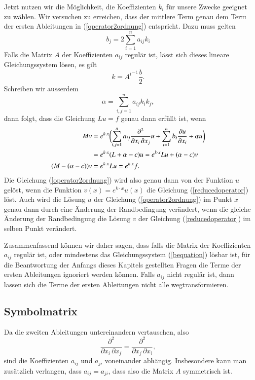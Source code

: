 Jetzt nutzen wir die Möglichkeit, die Koeffizienten $k_i$ für unsere
Zwecke geeignet zu wählen.
Wir versuchen zu erreichen, dass der mittlere Term genau dem Term 
der ersten Ableitungen in (\ref{operator2ordnung}) entspricht.
Dazu muss gelten
\begin{equation}
b_j=2\sum_{i=1}^n a_{ij}k_i
\label{bequation}
\end{equation}
Falls die Matrix $A$ der Koeffizienten $a_{ij}$ regulär ist, lässt
sich dieses lineare Gleichungssystem lösen, es gilt
\[
k=
{A^t}^{-1}
\frac{b}2.
\]
Schreiben wir ausserdem
\[
\alpha = \sum_{i,j=1}^n a_{ij}k_ik_j,
\]
dann folgt, dass die Gleichung $Lu=f$ genau dann erfüllt ist, wenn
\begin{align}
Mv
&=
e^{k\cdot x}\biggl(
\sum_{i,j=1}^n a_{ij}\frac{\partial^2}{\partial x_i\,\partial x_j}u
+\sum_{i=1}^n b_i\frac{\partial u}{\partial x_i}+\alpha u
\biggr)
\\
&=
e^{k\cdot x}
(L+\alpha -c)u
=
e^{k\cdot x}Lu + (\alpha -c)v
\notag
\\
(M-(\alpha - c))v&=e^{k\cdot x}Lu=e^{k\cdot x}f.
\label{reducedoperator}
\end{align}
Die Gleichung (\ref{operator2ordnung}) wird also genau dann von der
Funktion $u$ gelöst, wenn die Funktion $v(x)=e^{k\cdot x}u(x)$ 
die Gleichung (\ref{reducedoperator}) löst.
Auch wird die Lösung $u$ der Gleichung (\ref{operator2ordnung})
im Punkt $x$ 
genau dann durch eine Änderung der Randbedingung verändert, 
wenn die gleiche Änderung der Randbedingung die Lösung $v$ 
der Gleichung (\ref{reducedoperator}) im selben Punkt verändert.

Zusammenfassend können wir daher sagen, dass falls die Matrix der
Koeffizienten $a_{ij}$ regulär ist, oder mindestens das Gleichungssystem
(\ref{bequation}) lösbar ist, für die Beantwortung der Anfangs
dieses Kapitels gestellten Fragen die Terme der ersten Ableitungen
ignoriert werden können.
Falls $a_{ij}$ nicht regulär ist, dann lassen sich die Terme der
ersten Ableitungen nicht alle wegtransformieren.

\subsection{Symbolmatrix}
Da die zweiten Ableitungen untereinandern vertauschen, also 
\[
\frac{\partial^2}{\partial x_i\,\partial x_j}
=
\frac{\partial^2}{\partial x_j\,\partial x_i},
\]
sind die Koeffizienten $a_{ij}$ und $a_{ji}$ voneinander abhängig.
Insbesondere kann man zusätzlich verlangen, dass $a_{ij}=a_{ji}$,
dass also die Matrix $A$ symmetrisch ist.

